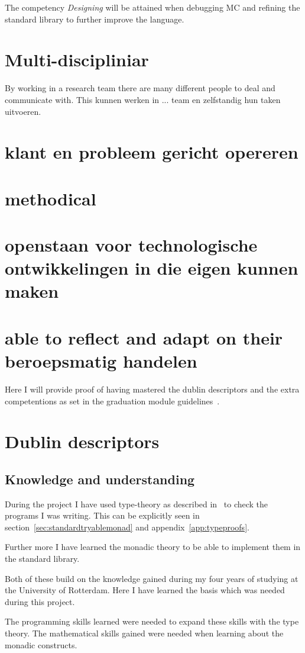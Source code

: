 The competency \emph{Designing} will be attained when debugging MC and refining the standard library to further improve the language.
\section{Multi-discipliniar}
By working in a research team there are many different people to deal and communicate with.
This
kunnen werken in ... team en zelfstandig hun taken uitvoeren.
\section{klant en probleem gericht opereren}
\section{methodical}
\section{openstaan voor technologische ontwikkelingen in die eigen kunnen maken}
\section{able to reflect and adapt on their beroepsmatig handelen}


Here I will provide proof of having mastered the dublin descriptors and the extra competentions as set in the graduation module guidelines~\cite{stuff}.

\section{Dublin descriptors}
\subsection{Knowledge and understanding}
During the project I have used type-theory as described in~\cite{stuff} to check the programs I was writing.
This can be explicitly seen in section~\ref{sec:standardtryablemonad} and appendix~\ref{app:typeproofs}.

Further more I have learned the monadic theory to be able to implement them in the standard library.

Both of these build on the knowledge gained during my four years of studying at the University of Rotterdam.
Here I have learned the basis which was needed during this project.

The programming skills learned were needed to expand these skills with the type theory.
The mathematical skills gained were needed when learning about the monadic constructs.


